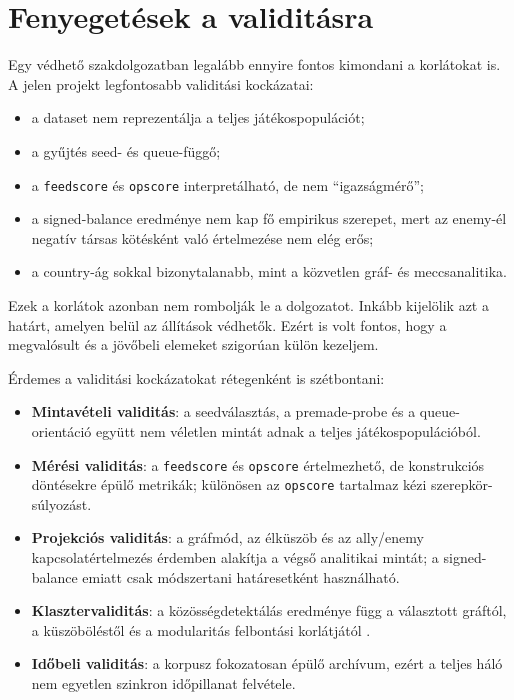 ﻿\documentclass[a4paper,12pt]{report}
\begin{document}
\section{Fenyegetések a validitásra}

Egy védhető szakdolgozatban legalább ennyire fontos kimondani a korlátokat is. A jelen projekt legfontosabb validitási kockázatai:

\begin{itemize}
    \item a dataset nem reprezentálja a teljes játékospopulációt;
    \item a gyűjtés seed- és queue-függő;
    \item a \texttt{feedscore} és \texttt{opscore} interpretálható, de nem ``igazságmérő'';
    \item a signed-balance eredménye nem kap fő empirikus szerepet, mert az enemy-él negatív társas kötésként való értelmezése nem elég erős;
    \item a country-ág sokkal bizonytalanabb, mint a közvetlen gráf- és meccsanalitika.
\end{itemize}

Ezek a korlátok azonban nem rombolják le a dolgozatot. Inkább kijelölik azt a határt, amelyen belül az állítások védhetők. Ezért is volt fontos, hogy a megvalósult és a jövőbeli elemeket szigorúan külön kezeljem.

Érdemes a validitási kockázatokat rétegenként is szétbontani:

\begin{itemize}
    \item \textbf{Mintavételi validitás}: a seedválasztás, a premade-probe és a queue-orientáció együtt nem véletlen mintát adnak a teljes játékospopulációból.
    \item \textbf{Mérési validitás}: a \texttt{feedscore} és \texttt{opscore} értelmezhető, de konstrukciós döntésekre épülő metrikák; különösen az \texttt{opscore} tartalmaz kézi szerepkör-súlyozást.
    \item \textbf{Projekciós validitás}: a gráfmód, az élküszöb és az ally/enemy kapcsolatértelmezés érdemben alakítja a végső analitikai mintát; a signed-balance emiatt csak módszertani határesetként használható.
    \item \textbf{Klasztervaliditás}: a közösségdetektálás eredménye függ a választott gráftól, a küszöböléstől és a modularitás felbontási korlátjától \cite{fortunato_barthelemy2007}.
    \item \textbf{Időbeli validitás}: a korpusz fokozatosan épülő archívum, ezért a teljes háló nem egyetlen szinkron időpillanat felvétele.
\end{itemize}
\end{document}
